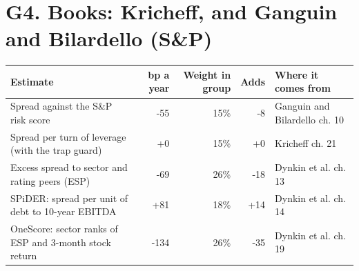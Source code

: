 \documentclass[11pt,a4paper]{article}
\begin{document}
\section*{G4. Books: Kricheff, and Ganguin and Bilardello (S\&P)}
\par\noindent{}
\begin{center}\footnotesize\setlength{\tabcolsep}{3.5pt}\begin{tabular}{@{}p{6.2cm}rrrp{4.2cm}@{}}\toprule
Estimate & bp a year & Weight in group & Adds & Where it comes from \\\midrule
Spread against the S\&P risk score & -55 & 15\% & -8 & Ganguin and Bilardello ch. 10 \\
Spread per turn of leverage (with the trap guard) & +0 & 15\% & +0 & Kricheff ch. 21 \\
Excess spread to sector and rating peers (ESP) & -69 & 26\% & -18 & Dynkin et al. ch. 13 \\
SPiDER: spread per unit of debt to 10-year EBITDA & +81 & 18\% & +14 & Dynkin et al. ch. 14 \\
OneScore: sector ranks of ESP and 3-month stock return & -134 & 26\% & -35 & Dynkin et al. ch. 19 \\
\bottomrule\end{tabular}\end{center}
\end{document}
